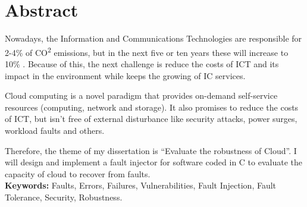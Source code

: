 \newpage
{}

\section*{Abstract}


Nowadays, the Information and Communications Technologies are responsible for 2-4\% of CO\textsuperscript{2} emissions, but in the next five or ten years these will increase to 10\% \cite{wolter2012resilience}. Because of this, the next challenge is reduce the costs of ICT and its impact in the environment while keeps the growing of IC services.


Cloud computing is a novel paradigm that provides on-demand self-service resources (computing, network and storage). It also promises to reduce the costs of ICT, but isn't free of external disturbance like security attacks, power surges, workload faults and others.

Therefore, the theme of my dissertation is ``Evaluate the robustness of Cloud''. I will design and implement a fault injector for software coded in C to evaluate the capacity of cloud to recover from faults.\\





\textbf{Keywords:} Faults, Errors, Failures, Vulnerabilities, Fault Injection, Fault Tolerance, Security, Robustness.
